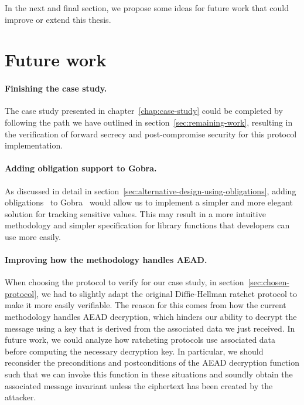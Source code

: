In the next and final section, we propose some ideas for future work that could improve or extend this thesis.

\section{Future work}
\label{sec:future-work}

\paragraph{Finishing the case study.}
The case study presented in chapter~\ref{chap:case-study} could be completed by following the path we have outlined in section~\ref{sec:remaining-work}, resulting in the verification of forward secrecy and post-compromise security for this protocol implementation.

\paragraph{Adding obligation support to Gobra.}
As discussed in detail in section~\ref{sec:alternative-design-using-obligations}, adding obligations~\cite{bostrom2014modular} to Gobra~\cite{wolf2021gobra} would allow us to implement a simpler and more elegant solution for tracking sensitive values.
This may result in a more intuitive methodology and simpler specification for library functions that developers can use more easily.

\paragraph{Improving how the methodology handles AEAD.}
When choosing the protocol to verify for our case study, in section~\ref{sec:chosen-protocol}, we had to slightly adapt the original Diffie-Hellman ratchet protocol to make it more easily verifiable.
The reason for this comes from how the current methodology handles AEAD decryption, which hinders our ability to decrypt the message using a key that is derived from the associated data we just received.
In future work, we could analyze how ratcheting protocols use associated data before computing the necessary decryption key.
In particular, we should reconsider the preconditions and postconditions of the AEAD decryption function such that we can invoke this function in these situations and soundly obtain the associated message invariant unless the ciphertext has been created by the attacker.